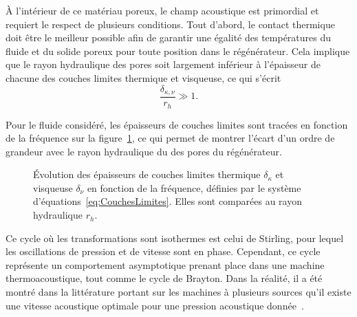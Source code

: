 \medskip

À l'intérieur de ce matériau poreux, le champ acoustique est primordial et requiert le respect de plusieurs conditions. Tout d'abord, le contact thermique doit être le meilleur possible afin de garantir une égalité des températures du fluide et du solide poreux pour toute position dans le régénérateur. Cela implique que le rayon hydraulique des pores soit largement inférieur à l'épaisseur de chacune des couches limites thermique et visqueuse, ce qui s'écrit
\begin{equation}
	\frac{\delta_{\kappa,\nu}}{r_h} \gg 1.
	\label{eq:ConditionIso_dkdv}
\end{equation}

Pour le fluide considéré, les épaisseurs de couches limites sont tracées en fonction de la fréquence sur la figure~\ref{fig:dKdV}, ce qui permet de montrer l'écart d'un ordre de grandeur avec le rayon hydraulique du des pores du régénérateur.

\begin{figure}[!ht]
    \centering
    
    \caption{\'Evolution des épaisseurs de couches limites thermique $\delta_\kappa$ et visqueuse $\delta_\nu$ en fonction de la fréquence, définies par le système d'équations~\eqref{eq:CouchesLimites}. Elles sont comparées au rayon hydraulique $r_h$.}
    \label{fig:dKdV}
\end{figure}

Ce cycle où les transformations sont isothermes est celui de Stirling, pour lequel les oscillations de pression et de vitesse sont en phase. Cependant, ce cycle représente un comportement asymptotique prenant place dans une machine thermoacoustique, tout comme le cycle de Brayton. Dans la réalité, il a été montré dans la littérature portant sur les machines à plusieurs sources qu'il existe une vitesse acoustique optimale pour une pression acoustique donnée~\cite{poignand_analysis_2013, poignand_etude_2006, poignand_optimal_2007, poignand_thermoacoustic_2011}. 

